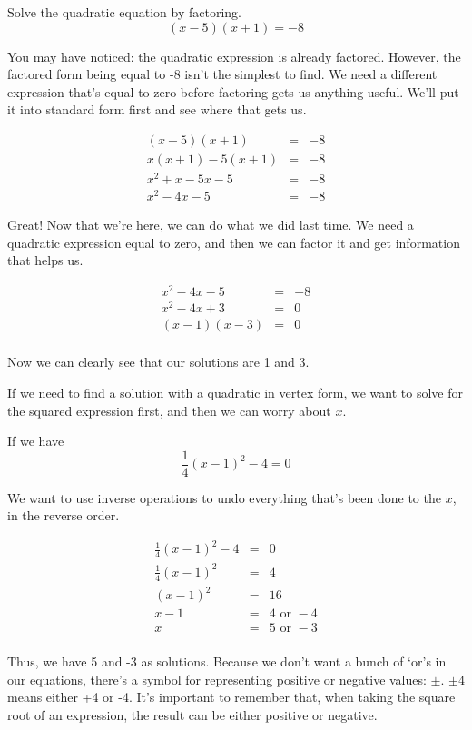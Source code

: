 \begin{example}
Solve the quadratic equation by factoring.
$$(x - 5)(x + 1) = -8$$

You may have noticed: the quadratic expression is already factored.  However, the factored form being equal to -8 isn't the simplest to find.  We need a different expression that's equal to zero before factoring gets us anything useful.  We'll put it into standard form first and see where that gets us.

$$\begin{array}{rcl}
(x - 5)(x + 1) & = & -8 \\
x(x+1) - 5(x+1) & = & -8 \\
x^2 + x - 5x - 5 & = & -8 \\
x^2 - 4x - 5 & = & -8
\end{array}$$

Great!  Now that we're here, we can do what we did last time.  We need a quadratic expression equal to zero, and then we can factor it and get information that helps us.

$$\begin{array}{rcl}
x^2 - 4x - 5 & = & -8 \\
x^2 - 4x + 3 & = & 0 \\
(x - 1)(x - 3) & = & 0 \\
\end{array}$$

Now we can clearly see that our solutions are 1 and 3.

\end{example}

If we need to find a solution with a quadratic in vertex form, we want to solve for the squared expression first, and then we can worry about $x$.

If we have
$$\frac{1}{4}(x - 1)^2 - 4 = 0$$

We want to use inverse operations to undo everything that's been done to the $x$, in the reverse order.

$$\begin{array}{rcl}
\frac{1}{4}(x - 1)^2 - 4 & =& 0\\
\frac{1}{4}(x - 1)^2 & =& 4 \\
(x - 1)^2 & =& 16 \\
x - 1 & =& 4 \text{ or } -4\\
x & = & 5 \text{ or } -3\\
\end{array}$$

Thus, we have 5 and -3 as solutions.  Because we don't want a bunch of `or's in our equations, there's a symbol for representing positive or negative values: $\pm$.  $\pm4$ means either +4 or -4.  It's important to remember that, when taking the square root of an expression, the result can be either positive or negative.

